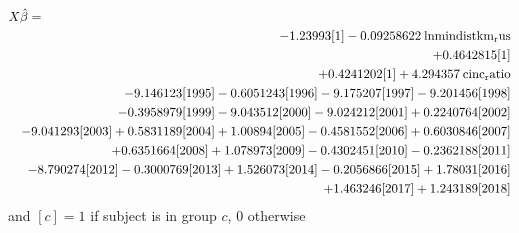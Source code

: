 \begin{eqnarray*}
\lefteqn{X\hat{\beta}=}\\
& &  -1.23993[{\rm 1}] -0.09258622\:{\rm lnmindistkm_rus} \\
& &  +0.4642815[{\rm 1}] \\
& &  +0.4241202[{\rm 1}] +4.294357\:{\rm cinc_ratio} \\
& &  -9.146123 [{\rm 1995}]-0.6051243[{\rm 1996}]-9.175207 [{\rm 1997}]-9.201456 [{\rm 1998}] \\
& &  -0.3958979[{\rm 1999}]-9.043512 [{\rm 2000}]-9.024212 [{\rm 2001}]+0.2240764 [{\rm 2002}] \\
& &  -9.041293 [{\rm 2003}]+0.5831189 [{\rm 2004}]+1.00894   [{\rm 2005}]-0.4581552[{\rm 2006}]+0.6030846 [{\rm 2007}] \\
& &  +0.6351664 [{\rm 2008}]+1.078973  [{\rm 2009}]-0.4302451[{\rm 2010}]-0.2362188[{\rm 2011}] \\
& &  -8.790274 [{\rm 2012}]-0.3000769[{\rm 2013}]+1.526073  [{\rm 2014}]-0.2056866[{\rm 2015}]+1.78031   [{\rm 2016}] \\
& &  +1.463246  [{\rm 2017}]+1.243189  [{\rm 2018}] \\
\end{eqnarray*}
and \([c]=1\) if subject is in group \(c\), 0 otherwise
